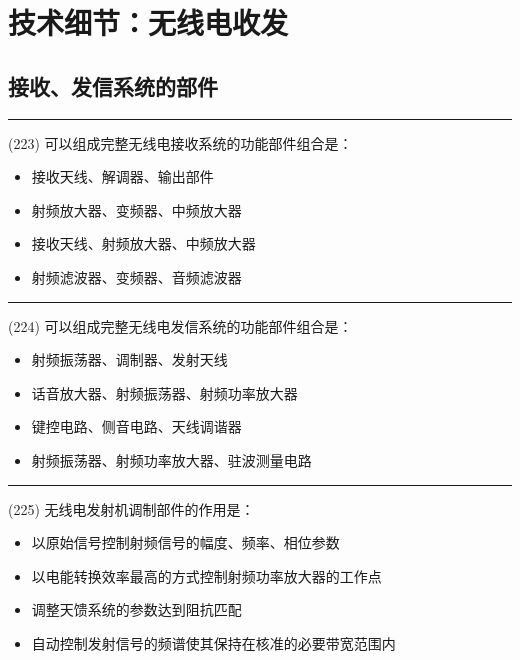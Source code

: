 \documentclass[twocolumn,hyperref,UTF8]{ctexart}  %
\begin{document}
\clearpage
\section{技术细节：无线电收发}


\subsection{接收、发信系统的部件}


\noindent\rule{0.5\textwidth}{1pt}
\heiti (223) 可以组成完整无线电接收系统的功能部件组合是： \songti {\color{gray} [LK0416] }
\begin{itemize}
	\item  接收天线、解调器、输出部件
	\item  射频放大器、变频器、中频放大器
	\item  接收天线、射频放大器、中频放大器
	\item  射频滤波器、变频器、音频滤波器
\end{itemize}


\noindent\rule{0.5\textwidth}{1pt}
\heiti (224) 可以组成完整无线电发信系统的功能部件组合是： \songti {\color{gray} [LK0417] }
\begin{itemize}
	\item  射频振荡器、调制器、发射天线
	\item  话音放大器、射频振荡器、射频功率放大器
	\item  键控电路、侧音电路、天线调谐器
	\item  射频振荡器、射频功率放大器、驻波测量电路
\end{itemize}




\noindent\rule{0.5\textwidth}{1pt}
\heiti (225) 无线电发射机{\color{cyan}调制部件}的作用是： \songti {\color{gray} [LK0418] }
\begin{itemize}
	\item  以原始信号控制射频信号的幅度、频率、相位参数
	\item  以电能转换效率最高的方式控制射频功率放大器的工作点
	\item  调整天馈系统的参数达到阻抗匹配
	\item  自动控制发射信号的频谱使其保持在核准的必要带宽范围内
\end{itemize}
\end{document}

